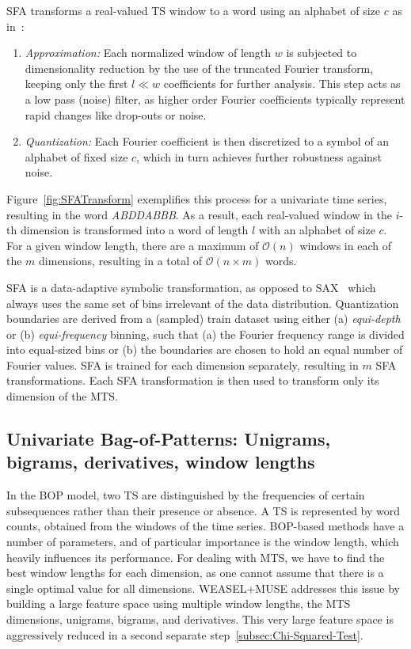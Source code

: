 \documentclass[sigconf]{acmart}
\begin{document}
SFA transforms a real-valued TS window to a word using an alphabet of size $c$ as in~\cite{SchaferH12}: 
 
 \begin{enumerate}
	\item \emph{Approximation:} Each normalized window of length $w$ is subjected to dimensionality reduction by the use of the truncated Fourier transform, keeping only the first $l \ll w$ coefficients for further analysis. This step acts as a low pass (noise) filter, as higher order Fourier coefficients typically represent rapid changes like drop-outs or noise.
 	\item \emph{Quantization:} Each Fourier coefficient is then discretized to a symbol of an alphabet of fixed size $c$, which in turn achieves further robustness against noise.
 \end{enumerate}
 
Figure~\ref{fig:SFATransform} exemplifies this process for a univariate time series, resulting in the word \emph{ABDDABBB}. 
As a result, each real-valued window in the $i$-th dimension is transformed into a word of length $l$ with an alphabet of size $c$. For a given window length, there are a maximum of $\mathcal{O}(n)$ windows in each of the $m$ dimensions, resulting in a total of $\mathcal{O}(n \times m)$ words.
  
SFA is a data-adaptive symbolic transformation, as opposed to SAX~\cite{Lin2007} which always uses the same set of bins irrelevant of the data distribution. Quantization boundaries are derived from a (sampled) train dataset using either (a) \emph{equi-depth} or (b) \emph{equi-frequency} binning, such that (a) the Fourier frequency range is divided into equal-sized bins or (b) the boundaries are chosen to hold an equal number of Fourier values. SFA is trained for each dimension separately, resulting in $m$ SFA transformations. Each SFA transformation is then used to transform only its dimension of the MTS.



\subsection{Univariate Bag-of-Patterns: Unigrams, bigrams, derivatives, window lengths}\label{subsec:BOP}

In the BOP model, two TS are distinguished by the frequencies of certain subsequences rather than their presence or absence. A TS is represented by word counts, obtained from the windows of the time series. BOP-based methods have a number of parameters, and of particular importance is the window length, which heavily influences its performance. For dealing with MTS, we have to find the best window lengths for each dimension, as one cannot assume that there is a single optimal value for all dimensions. 
WEASEL+MUSE addresses this issue by building a large feature space using multiple window lengths, the MTS dimensions, unigrams, bigrams, and derivatives. This very large feature space is aggressively reduced in a second separate step~\ref{subsec:Chi-Squared-Test}. 
\end{document}
